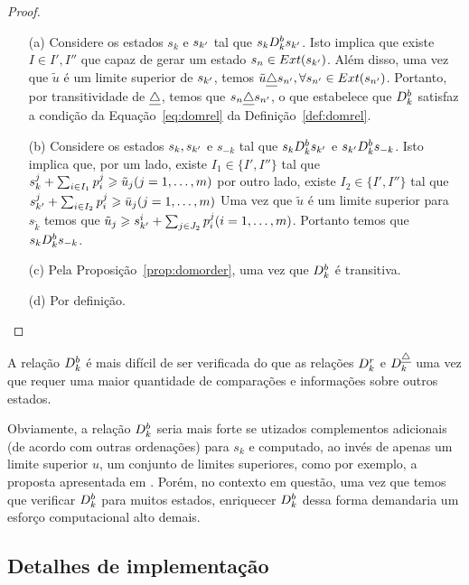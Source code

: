 \begin{proof}
  \noindent
  \begin{enumerate}
    \item[(a)]{ Considere os estados $s_k$ e $s_{{k'}}$ tal que $s_k D_k^{b} s_{{k'}}$.
      Isto implica que existe $I \in {I', I''}$ que capaz de gerar um estado $s_n \in Ext(s_{{k'}})$.
      Além disso, uma vez que $\tilde{u}$ é um limite superior de $s_{{k'}}$,
      temos $\tilde{u} \underline{\triangle} s_{{n'}}, \forall s_{{n'}} \in Ext(s_{{n'}})$.
      Portanto, por transitividade de $\underline{\triangle}$, temos que $s_n \underline{\triangle} s_{{n'}}$,
      o que estabelece que $D_k^{b}$ satisfaz a condição da Equação~\ref{eq:domrel}
      da Definição~\ref{def:domrel}.
      }
    \item[(b)]{ Considere os estados $s_k, s_{{k'}}$ e $s_{-k}$ tal que
      $s_k D_k^{b} s_{{k'}}$ e $s_{{k'}} D_k^{b} s_{-k}$.
      Isto implica que, por um lado, existe $I_1 \in \{I', I''\}$ tal que
      $s_k^j + \sum_{i \in I_1} p^j_i \geqslant \tilde{u}_j (j = 1, \ldots, m)$
      por outro lado, existe $I_2 \in \{I', I''\}$ tal que
      $s_{{k'}}^j + \sum_{i \in I_2} p^j_i \geqslant \bar{u}_j (j = 1, \ldots, m)$
      Uma vez que $\tilde{u}$ é um limite superior para $s_{\tilde{k}}$ temos que
      $\tilde{u}_j \geqslant s_{{k'}}^i + \sum_{j \in J_2} p^j_i (i = 1, \ldots, m)$.
      Portanto temos que $s_k D_k^{b} s_{-k}$. }
    \item[(c)]{Pela Proposição~\ref{prop:domorder}, uma vez que $D_k^{b}$ é transitiva.}
    \item[(d)]{Por definição.} \qedhere
  \end{enumerate}
\end{proof}
A relação $D_k^{b}$ é mais difícil de ser verificada do que as relações
$D_k^r$ e $D_k^{\underline{\triangle}}$ uma vez que requer uma maior quantidade de
comparações e informações sobre outros estados.

Obviamente, a relação $D_k^{b}$ seria mais forte se utizados complementos
adicionais (de acordo com outras ordenações) para $s_k$ e computado,
ao invés de apenas um limite superior $u$, um conjunto de limites superiores,
como por exemplo, a proposta apresentada em \cite{ehrgott2007bound}.
Porém, no contexto em questão, uma vez que temos que verificar $D_k^{b}$
para muitos estados, enriquecer $D_k^{b}$ dessa forma demandaria um
esforço computacional alto demais.

\subsection{Detalhes de implementação}


